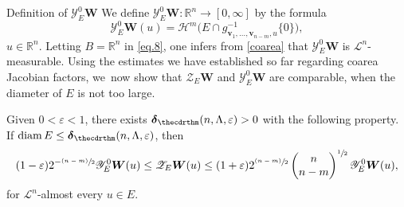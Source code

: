 \documentclass[JEP,XML,SOM,Unicode,ThmDefs,NoEqCountersInSection]{cedram}
\newcommand{\psfrac}[2]{\sfrac{(#1)}{#2}}
\newenvironment{Empty}[2][\null]{%
\begin{enonce}[remark]{#1}#2}
{\end{enonce}}
\newcommand{\R}{\mathbb{R}}
\newcommand{\Rn}{\R^n}
\newcommand{\calH}{\mathscr{H}}
\newcommand{\calL}{\mathscr{L}}
\newcommand{\calY}{\mathscr{Y}}
\newcommand{\calZ}{\mathscr{Z}}
\newcommand{\bdelta}{\boldsymbol{\delta}}
\newcommand{\bW}{{\boldsymbol{W}}}
\newcommand{\bv}{{\boldsymbol{v}}}
\DeclareMathOperator{\rmdiam}{\mathrm{diam}}
\newcommand{\bin}[2]{
\begin{pmatrix} #1 \\
#2
\end{pmatrix}}
\let\veps\varepsilon
\begin{document}
\begin{Empty}[Definition of $\calY_E^0 \bW$]
\label{def.Y0}
We define $\calY^0_E\bW: \Rn \to [0,\infty]$ by the formula\vspace*{-2pt}
\begin{equation}
\label{eq.14}
\calY_E^0 \bW(u) = \calH^m \bigl(E \cap g_{\bv_1,\ldots,\bv_{n-m},u}^{-1}\{0\}\bigr),
\end{equation}
$u \in \Rn$.
Letting $B = \Rn$ in \eqref{eq.8}, one infers from \ref{coarea} that $\calY^0_E\bW$ is $\calL^n$-measurable.
Using the estimates we have established so far regarding coarea Jacobian factors, we~now show that $\calZ_E \bW$ and $\calY_E^0 \bW$ are comparable, when the diameter of $E$ is not too large.
\end{Empty}

\begin{Proposition}
\label{Z.1}
Given $0 < \veps < 1$, there exists $\bdelta_{\thecdrthm}(n,\Lambda,\veps) > 0$ with the following property. If $\rmdiam E \leq \bdelta_{\thecdrthm}(n,\Lambda,\veps)$, then\vspace*{-5pt}\enlargethispage{.5\baselineskip}
\begin{equation*}
(1-\veps) 2^{-\psfrac{n-m}{2}} \calY^0_E \bW(u) \leq \calZ_E \bW(u) \leq (1+\veps) 2^{\psfrac{n-m}{2}} \bin{n}{n-m}^{\sfrac{1}{2}}\calY^0_E \bW(u),
\end{equation*}
for $\calL^n$-almost every $u \in E$.
\end{Proposition}
\end{document}
